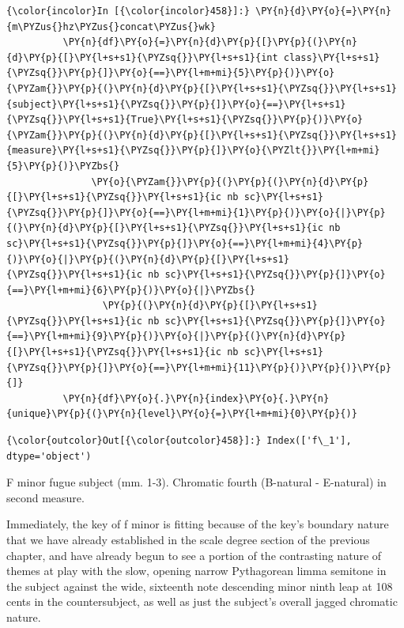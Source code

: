     \begin{Verbatim}[commandchars=\\\{\}]
{\color{incolor}In [{\color{incolor}458}]:} \PY{n}{d}\PY{o}{=}\PY{n}{m\PYZus{}hz\PYZus{}concat\PYZus{}wk}
          \PY{n}{df}\PY{o}{=}\PY{n}{d}\PY{p}{[}\PY{p}{(}\PY{n}{d}\PY{p}{[}\PY{l+s+s1}{\PYZsq{}}\PY{l+s+s1}{int class}\PY{l+s+s1}{\PYZsq{}}\PY{p}{]}\PY{o}{==}\PY{l+m+mi}{5}\PY{p}{)}\PY{o}{\PYZam{}}\PY{p}{(}\PY{n}{d}\PY{p}{[}\PY{l+s+s1}{\PYZsq{}}\PY{l+s+s1}{subject}\PY{l+s+s1}{\PYZsq{}}\PY{p}{]}\PY{o}{==}\PY{l+s+s1}{\PYZsq{}}\PY{l+s+s1}{True}\PY{l+s+s1}{\PYZsq{}}\PY{p}{)}\PY{o}{\PYZam{}}\PY{p}{(}\PY{n}{d}\PY{p}{[}\PY{l+s+s1}{\PYZsq{}}\PY{l+s+s1}{measure}\PY{l+s+s1}{\PYZsq{}}\PY{p}{]}\PY{o}{\PYZlt{}}\PY{l+m+mi}{5}\PY{p}{)}\PYZbs{}
               \PY{o}{\PYZam{}}\PY{p}{(}\PY{p}{(}\PY{n}{d}\PY{p}{[}\PY{l+s+s1}{\PYZsq{}}\PY{l+s+s1}{ic nb sc}\PY{l+s+s1}{\PYZsq{}}\PY{p}{]}\PY{o}{==}\PY{l+m+mi}{1}\PY{p}{)}\PY{o}{|}\PY{p}{(}\PY{n}{d}\PY{p}{[}\PY{l+s+s1}{\PYZsq{}}\PY{l+s+s1}{ic nb sc}\PY{l+s+s1}{\PYZsq{}}\PY{p}{]}\PY{o}{==}\PY{l+m+mi}{4}\PY{p}{)}\PY{o}{|}\PY{p}{(}\PY{n}{d}\PY{p}{[}\PY{l+s+s1}{\PYZsq{}}\PY{l+s+s1}{ic nb sc}\PY{l+s+s1}{\PYZsq{}}\PY{p}{]}\PY{o}{==}\PY{l+m+mi}{6}\PY{p}{)}\PY{o}{|}\PYZbs{}
                 \PY{p}{(}\PY{n}{d}\PY{p}{[}\PY{l+s+s1}{\PYZsq{}}\PY{l+s+s1}{ic nb sc}\PY{l+s+s1}{\PYZsq{}}\PY{p}{]}\PY{o}{==}\PY{l+m+mi}{9}\PY{p}{)}\PY{o}{|}\PY{p}{(}\PY{n}{d}\PY{p}{[}\PY{l+s+s1}{\PYZsq{}}\PY{l+s+s1}{ic nb sc}\PY{l+s+s1}{\PYZsq{}}\PY{p}{]}\PY{o}{==}\PY{l+m+mi}{11}\PY{p}{)}\PY{p}{)}\PY{p}{]}
          \PY{n}{df}\PY{o}{.}\PY{n}{index}\PY{o}{.}\PY{n}{unique}\PY{p}{(}\PY{n}{level}\PY{o}{=}\PY{l+m+mi}{0}\PY{p}{)}
\end{Verbatim}
\begin{Verbatim}[commandchars=\\\{\}]
{\color{outcolor}Out[{\color{outcolor}458}]:} Index(['f\_1'], dtype='object')
\end{Verbatim}


\begin{Example}[H]
\vspace{1.5em}
    \centering
    \caption[Chromatic fourth in f minor fugue subject (mm. 1-3). ]{ F minor fugue subject (mm. 1-3). Chromatic fourth (B-natural - E-natural) in second measure.}
\end{Example}    
    Immediately, the key of f minor is fitting because of the key's boundary
nature that we have already established in the scale degree section of
the previous chapter, and have already begun to see a portion of the
contrasting nature of themes at play with the slow, opening narrow
Pythagorean limma semitone in the subject against the wide, sixteenth
note descending minor ninth leap at 108 cents in the countersubject, as
well as just the subject's overall jagged chromatic nature.

